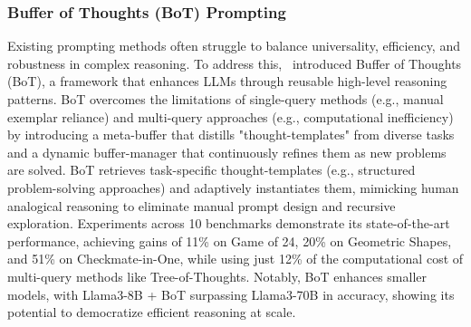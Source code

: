 \documentclass{article}
\begin{document}
\subsubsection{Buffer of Thoughts (BoT) Prompting}
\label{BoT}
\noindent 
Existing prompting methods often struggle to balance universality, efficiency, and robustness in complex reasoning. To address this,~\cite{yang2024buffer} introduced Buffer of Thoughts (BoT), a framework that enhances LLMs through reusable high-level reasoning patterns.
BoT overcomes the limitations of single-query methods (e.g., manual exemplar reliance) and multi-query approaches (e.g., computational inefficiency) by introducing a meta-buffer that distills "thought-templates" from diverse tasks and a dynamic buffer-manager that continuously refines them as new problems are solved. BoT retrieves task-specific thought-templates (e.g., structured problem-solving approaches) and adaptively instantiates them, mimicking human analogical reasoning to eliminate manual prompt design and recursive exploration. Experiments across 10 benchmarks demonstrate its state-of-the-art performance, achieving gains of 11\% on Game of 24, 20\% on Geometric Shapes, and 51\% on Checkmate-in-One, while using just 12\% of the computational cost of multi-query methods like Tree-of-Thoughts. Notably, BoT enhances smaller models, with Llama3-8B + BoT surpassing Llama3-70B in accuracy, showing its potential to democratize efficient reasoning at scale.
\end{document}
